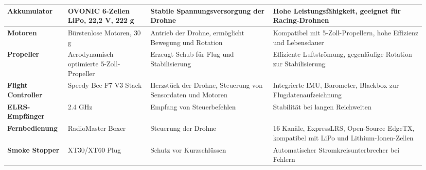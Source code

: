\begin{longtable}{|l|p{4cm}|p{4cm}|p{4cm}|}
	\textbf{Akkumulator}      & OVONIC 6-Zellen LiPo, 22,2 V, 222 g                                                                               & Stabile Spannungsversorgung der Drohne                                                                                     & Hohe Leistungsfähigkeit, geeignet für Racing-Drohnen                                                           \\ \hline
	\textbf{Motoren}          & Bürstenlose Motoren, 30 g                                                                                         & Antrieb der Drohne, ermöglicht Bewegung und Rotation                                                                       & Kompatibel mit 5-Zoll-Propellern, hohe Effizienz und Lebensdauer                                               \\ \hline
	\textbf{Propeller}        & Aerodynamisch optimierte 5-Zoll-Propeller                                                                          & Erzeugt Schub für Flug und Stabilisierung                                                                                 & Effiziente Luftströmung, gegenläufige Rotation zur Stabilisierung                                               \\ \hline
	\textbf{Flight Controller} & Speedy Bee F7 V3 Stack                                                                                           & Herzstück der Drohne, Steuerung von Sensordaten und Motoren                                                                & Integrierte IMU, Barometer, Blackbox zur Flugdatenaufzeichnung                                                  \\ \hline
	\textbf{ELRS-Empfänger}   & 2.4 GHz                                                                                                           & Empfang von Steuerbefehlen                                                                                                & Stabilität bei langen Reichweiten                                                                              \\ \hline
	\textbf{Fernbedienung}    & RadioMaster Boxer                                                                                                 & Steuerung der Drohne                                                                                                      & 16 Kanäle, ExpressLRS, Open-Source EdgeTX, kompatibel mit LiPo und Lithium-Ionen-Zellen                         \\ \hline
	\textbf{Smoke Stopper}    & XT30/XT60 Plug                                                                                                    & Schutz vor Kurzschlüssen                                                                                                  & Automatischer Stromkreisunterbrecher bei Fehlern                                                                \\ \hline

\end{longtable}
